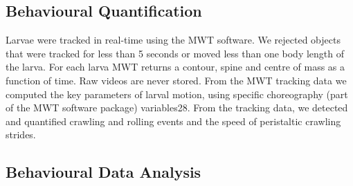 \subsection{Behavioural Quantification}
Larvae were tracked in real-time using the MWT software. We rejected objects that were tracked for less than 5 seconds or moved less than one body length of the larva. For each larva MWT returns a contour, spine and centre of mass as a function of time. Raw videos are never stored. From the MWT tracking data we computed the key parameters of larval motion, using specific choreography (part of the MWT software package) variables28. From the tracking data, we detected and quantified crawling and rolling events and the speed of peristaltic crawling strides.%

\subsection{Behavioural Data Analysis}










